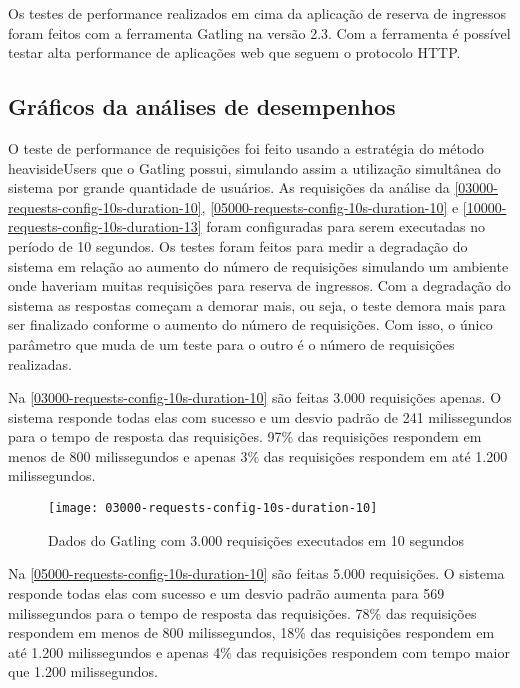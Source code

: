 Os testes de performance realizados em cima da aplicação de reserva de ingressos foram
feitos com a ferramenta Gatling na versão 2.3.
Com a ferramenta é possível testar alta performance de aplicações web
\cite{gatling-docs} que seguem o protocolo HTTP.

\subsection{Gráficos da análises de desempenhos}

O teste de performance de requisições foi feito usando a
estratégia do método heavisideUsers \cite{gatling-simulation-setup}
que o Gatling possui, simulando assim a utilização simultânea do sistema por
grande quantidade de usuários.
As requisições da análise da
\autoref{03000-requests-config-10s-duration-10},
\autoref{05000-requests-config-10s-duration-10}
e \autoref{10000-requests-config-10s-duration-13}
foram configuradas para serem executadas no período de 10 segundos.
Os testes foram feitos para medir a degradação do sistema em relação ao aumento do
número de requisições simulando um ambiente onde haveriam muitas requisições para
reserva de ingressos.
Com a degradação do sistema as respostas começam a demorar mais, ou seja,
o teste demora mais para ser finalizado conforme o aumento do número de requisições.
Com isso, o único parâmetro que muda de um teste para o outro
é o número de requisições realizadas.

Na \autoref{03000-requests-config-10s-duration-10} são feitas 3.000 requisições apenas.
O sistema responde todas elas com sucesso e um desvio padrão de 241 milissegundos
para o tempo de resposta das requisições.
97\% das requisições respondem em menos de 800 milissegundos e apenas 3\% das requisições
respondem em até 1.200 milissegundos.

\begin{figure}[h]
  \texttt{[image: 03000-requests-config-10s-duration-10]}
  \caption{Dados do Gatling com 3.000 requisições executados em 10 segundos}
  \label{03000-requests-config-10s-duration-10}
\end{figure}

Na \autoref{05000-requests-config-10s-duration-10} são feitas 5.000 requisições.
O sistema responde todas elas com sucesso e um desvio padrão aumenta para 569 milissegundos
para o tempo de resposta das requisições.
78\% das requisições respondem em menos de 800 milissegundos, 18\% das requisições
respondem em até 1.200 milissegundos e apenas 4\% das requisições
respondem com tempo maior que 1.200 milissegundos.


